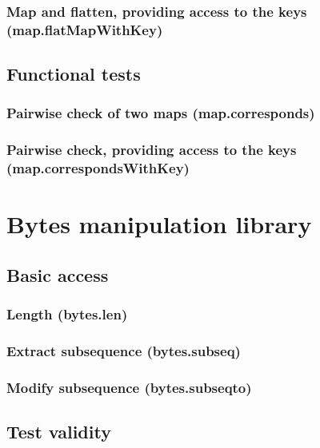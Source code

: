 \documentclass{article}
\theoremstyle{definition}
\begin{document}
\subsubsection{Map and flatten, providing access to the keys (map.flatMapWithKey)}

\subsection{Functional tests}

\subsubsection{Pairwise check of two maps (map.corresponds)}

\subsubsection{Pairwise check, providing access to the keys (map.correspondsWithKey)}

\pagebreak
\section{Bytes manipulation library}

\subsection{Basic access}

\subsubsection{Length (bytes.len)}

\subsubsection{Extract subsequence (bytes.subseq)}

\subsubsection{Modify subsequence (bytes.subseqto)}

\subsection{Test validity}
\end{document}
